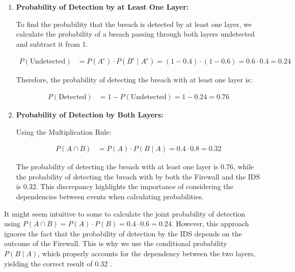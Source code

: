 \begin{solution}
\begin{enumerate}[label=(\alph*)]
    \item \textbf{Probability of Detection by at Least One Layer:}

    To find the probability that the breach is detected by at least one layer, we calculate the probability of a breach passing through both layers undetected and subtract it from 1.

    \begin{align*}
        P(\text{Undetected}) &= P(A^c) \cdot P(B^c \mid A^c) 
        = (1 - 0.4) \cdot (1 - 0.6) 
        = 0.6 \cdot 0.4
        = 0.24
    \end{align*}

    Therefore, the probability of detecting the breach with at least one layer is:

    \begin{align*}
    P(\text{Detected}) &= 1 - P(\text{Undetected}) = 1 - 0.24 = 0.76
    \end{align*}

    \item \textbf{Probability of Detection by Both Layers:}

    Using the Multiplication Rule:

    \begin{align*}
    P(A \cap B) &= P(A) \cdot P(B \mid A) = 0.4 \cdot 0.8 = 0.32
    \end{align*}

    The probability of detecting the breach with at least one layer is 0.76, while the probability of detecting the breach with by both the Firewall and the IDS is 0.32. This discrepancy highlights the importance of considering the dependencies between events when calculating probabilities.
\end{enumerate}
\end{solution}

\begin{remark}
    It might seem intuitive to some to calculate the joint probability of detection using $P(A \cap B)=P(A) \cdot P(B)=0.4 \cdot 0.6=0.24$. However, this approach ignores the fact that the probability of detection by the IDS depends on the outcome of the Firewall. This is why we use the conditional probability $P(B \mid A)$, which properly accounts for the dependency between the two layers, yielding the correct result of 0.32 .
\end{remark}

